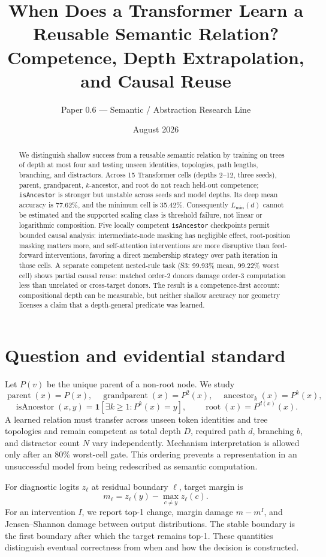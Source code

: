 \documentclass[10pt]{article}
\title{When Does a Transformer Learn a Reusable Semantic Relation?\\Competence, Depth Extrapolation, and Causal Reuse}
\author{Paper 0.6 --- Semantic / Abstraction Research Line}\date{August 2026}
\begin{document}
\maketitle
\begin{abstract}
We distinguish shallow success from a reusable semantic relation by training on trees of depth at most four and testing unseen identities, topologies, path lengths, branching, and distractors. Across 15 Transformer cells (depths 2--12, three seeds), parent, grandparent, $k$-ancestor, and root do not reach held-out competence; \texttt{isAncestor} is stronger but unstable across seeds and model depths. Its deep mean accuracy is 77.62\%, and the minimum cell is 35.42\%. Consequently $L_{\min}(d)$ cannot be estimated and the supported scaling class is threshold failure, not linear or logarithmic composition. Five locally competent \texttt{isAncestor} checkpoints permit bounded causal analysis: intermediate-node masking has negligible effect, root-position masking matters more, and self-attention interventions are more disruptive than feed-forward interventions, favoring a direct membership strategy over path iteration in those cells. A separate competent nested-rule task (S3: 99.93\% mean, 99.22\% worst cell) shows partial causal reuse: matched order-2 donors damage order-3 computation less than unrelated or cross-target donors. The result is a competence-first account: compositional depth can be measurable, but neither shallow accuracy nor geometry licenses a claim that a depth-general predicate was learned.
\end{abstract}

\section{Question and evidential standard}
Let $P(v)$ be the unique parent of a non-root node. We study
\[
 \operatorname{parent}(x)=P(x),\quad \operatorname{grandparent}(x)=P^2(x),\quad
 \operatorname{ancestor}_k(x)=P^k(x),
\]
\[
 \operatorname{isAncestor}(x,y)=\mathbf 1[\exists k\ge1:P^k(x)=y],\qquad
 \operatorname{root}(x)=P^{d(x)}(x).
\]
A learned relation must transfer across unseen token identities and tree topologies and remain competent as total depth $D$, required path $d$, branching $b$, and distractor count $N$ vary independently. Mechanism interpretation is allowed only after an 80\% worst-cell gate. This ordering prevents a representation in an unsuccessful model from being redescribed as semantic computation.

For diagnostic logits $z_\ell$ at residual boundary $\ell$, target margin is
\[m_\ell=z_\ell(y)-\max_{c\ne y}z_\ell(c).\]
For an intervention $I$, we report top-1 change, margin damage $m-m^I$, and Jensen--Shannon damage between output distributions. The stable boundary is the first boundary after which the target remains top-1. These quantities distinguish eventual correctness from when and how the decision is constructed.
\end{document}
